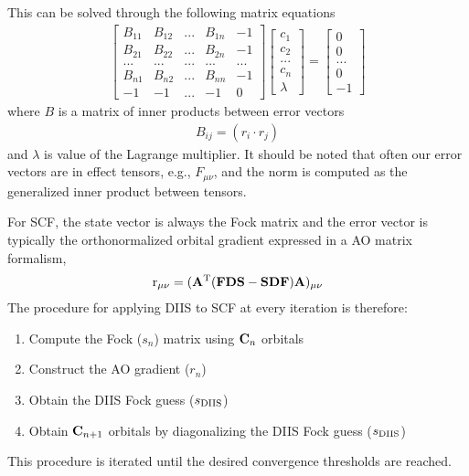 \documentclass[aip,jcp,preprint,superscriptaddress,floatfix]{revtex4-1}
\begin{document}
This can be solved through the following matrix equations
\begin{eqnarray}
\begin{bmatrix}
 B_{11}&   B_{12}&  ...& B_{1n} & -1\\ 
  B_{21}&   B_{22}&  ...& B_{2n} & -1\\ 
 ...&  ...&  ...&  ...& ...\\ 
  B_{n1}&  B_{n2}&  ...&   B_{nn}& -1\\ 
 -1& -1 & ... &  -1& 0
\end{bmatrix}
\begin{bmatrix}
c_1\\
c_2\\
...\\
c_n\\
\lambda
\end{bmatrix}
=
\begin{bmatrix}
0\\
0\\
...\\
0\\
-1
\end{bmatrix}
\end{eqnarray}
where $B$ is a matrix of inner products between error vectors
\begin{eqnarray}
B_{ij} = (r_i \cdot r_j)
\end{eqnarray}
and $\lambda$ is value of the Lagrange multiplier.
It should be noted that often our error vectors are in effect tensors, e.g., $F_{\mu\nu}$, and the norm is computed as the generalized inner product between tensors.

For SCF, the state vector is always the Fock matrix and the error vector is typically the orthonormalized orbital gradient expressed in a AO matrix formalism,
\begin{eqnarray}
{\rm r_{\mu\nu} = ({\bf A}^T({\rm\bf FDS} - {\rm\bf SDF}}){\bf A})_{\mu\nu}
\end{eqnarray}
The procedure for applying DIIS to SCF at every iteration is therefore:
\begin{enumerate}
\item Compute the Fock ($s_n$) matrix using ${\bf C}_{n}$ orbitals
\item Construct the AO gradient ($r_n$)
\item Obtain the DIIS Fock guess ($s_{\rm DIIS}$)
\item Obtain ${\bf C}_{n+1}$ orbitals by diagonalizing the DIIS Fock guess ($s_{\rm DIIS}$)
\end{enumerate}
This procedure is iterated until the desired convergence thresholds are reached.
\end{document}
